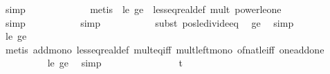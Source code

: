 \begin{isabellebody}
\ simp\isanewline
\ \ \ \ \ \ \ \ \ \ \ \isamarkupfalse%
\ {\isacharparenleft}{\kern0pt}metis\ \ {\isasymdelta}{\isacharprime}{\kern0pt}{\isacharunderscore}{\kern0pt}le{\isacharunderscore}{\kern0pt}{}\ {\isasymdelta}{\isacharprime}{\kern0pt}{\isacharunderscore}{\kern0pt}ge{\isacharunderscore}{\kern0pt}{}\ \ less{\isacharunderscore}{\kern0pt}eq{\isacharunderscore}{\kern0pt}real{\isacharunderscore}{\kern0pt}def\ mult{\isacharunderscore}{\kern0pt}{}\ power{\isacharunderscore}{\kern0pt}le{\isacharunderscore}{\kern0pt}one{\isacharparenright}{\kern0pt}\isanewline
\ \ \ \ \ \ \ \ \ \ \isamarkupfalse%
\ simp\isanewline
\ \ \ \ \ \ \ \ \ \isamarkupfalse%
\ simp\isanewline
\ \ \ \ \ \ \ \ \ \isamarkupfalse%
\ {\isacharparenleft}{\kern0pt}subst\ pos{\isacharunderscore}{\kern0pt}le{\isacharunderscore}{\kern0pt}divide{\isacharunderscore}{\kern0pt}eq{\isacharparenright}{\kern0pt}\ \isamarkupfalse%
\ {\isasymdelta}{\isacharprime}{\kern0pt}{\isacharunderscore}{\kern0pt}ge{\isacharunderscore}{\kern0pt}{}\ \isamarkupfalse%
\ simp\isanewline
\ \ \ \ \ \ \ \ \ \isamarkupfalse%
\ {\isasymdelta}{\isacharprime}{\kern0pt}{\isacharunderscore}{\kern0pt}le{\isacharunderscore}{\kern0pt}{}\ {\isasymdelta}{\isacharprime}{\kern0pt}{\isacharunderscore}{\kern0pt}ge{\isacharunderscore}{\kern0pt}{}\ \isanewline
\ \ \ \ \ \ \ \ \ \isamarkupfalse%
\ {\isacharparenleft}{\kern0pt}metis\ add{\isacharunderscore}{\kern0pt}mono\ less{\isacharunderscore}{\kern0pt}eq{\isacharunderscore}{\kern0pt}real{\isacharunderscore}{\kern0pt}def\ mult{\isacharunderscore}{\kern0pt}eq{\isacharunderscore}{\kern0pt}{}{\isacharunderscore}{\kern0pt}iff\ mult{\isacharunderscore}{\kern0pt}left{\isacharunderscore}{\kern0pt}mono\ of{\isacharunderscore}{\kern0pt}nat{\isacharunderscore}{\kern0pt}{}{\isacharunderscore}{\kern0pt}le{\isacharunderscore}{\kern0pt}iff\ one{\isacharunderscore}{\kern0pt}add{\isacharunderscore}{\kern0pt}one{\isacharparenright}{\kern0pt}\isanewline
\ \ \ \ \ \ \ \ \isamarkupfalse%
\ {\isasymdelta}{\isacharprime}{\kern0pt}{\isacharunderscore}{\kern0pt}le{\isacharunderscore}{\kern0pt}{}\ {\isasymdelta}{\isacharprime}{\kern0pt}{\isacharunderscore}{\kern0pt}ge{\isacharunderscore}{\kern0pt}{}\ \isamarkupfalse%
\ simp\isanewline
\ \ \ \ \ \ \isamarkupfalse%
\ \isamarkupfalse%
\ {\isachardoublequoteopen}{\isachardot}{\kern0pt}{\isachardot}{\kern0pt}{\isachardot}{\kern0pt}\ {\isasymle}\ {\isacharparenleft}{\kern0pt}{}{}\ {\isacharslash}{\kern0pt}\ {\isasymdelta}{\isacharprime}{\kern0pt}\ {\isacharplus}{\kern0pt}\ {\isacharparenleft}{\kern0pt}t\ {\isacharminus}{\kern0pt}\ {}{}\ {\isacharslash}{\kern0pt}\ {\isacharparenleft}{\kern0pt}{}{\isacharasterisk}{\kern0pt}{\isasymdelta}{\isacharprime}{\kern0pt}{\isacharparenright}{\kern0pt}{\isacharparenright}{\kern0pt}{\isacharparenright}{\kern0pt}\ {\isacharplus}{\kern0pt}\ {}\ {\isacharslash}{\kern0pt}\ {\isasymdelta}{\isacharprime}{\kern0pt}{\isachardoublequoteclose}\ \isanewline

\end{isabellebody}
